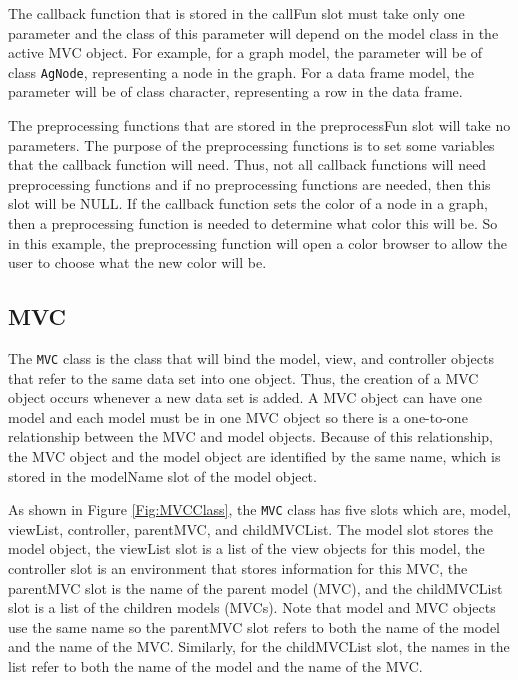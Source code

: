 \documentclass{article}[11pt]
\newcommand{\Robject}[1]{{\texttt{#1}}}
\begin{document}
The callback function that is stored in the callFun slot must take only one
parameter and the class of this parameter will depend on the model class in
the active MVC object.  For example, for a graph model, the
parameter will be of class \Robject{AgNode}, representing a node in the graph.
For a data frame model, the parameter will be of class character, representing
a row in the data frame.

The preprocessing functions that are stored in the preprocessFun slot will
take no parameters.  The purpose of the preprocessing functions is to set some
variables that the callback function will need.  Thus, not all callback
functions will need preprocessing functions and if no preprocessing functions
are needed, then this slot will be NULL.  If the callback function sets the
color of a node in a graph, then a preprocessing function is needed to
determine what color this will be.  So in this example, the preprocessing
function will open a color browser to allow the user to choose what the new
color will be.

\subsection{MVC}\label{Ssec:OneMVC}
 
The \Robject{MVC} class is the class that will bind the model, view, and
controller objects that refer to the same data set into one object.  Thus, the
creation of a MVC object occurs whenever a new data set is added.  A
MVC object can have one model and each model must be in one
MVC object so there is a one-to-one relationship between the
MVC and model objects.  Because of this relationship, the
MVC object and the model object are identified by the same name,
which is stored in the modelName slot of the model object. 

As shown in Figure \ref{Fig:MVCClass}, the \Robject{MVC} class has five slots
which are, model, viewList, controller, parentMVC, and childMVCList.  The
model slot stores the model object, the viewList slot is a list of the view
objects for this model, the controller slot is an environment that stores
information for this MVC, the parentMVC slot is the name of the parent model
(MVC), and the childMVCList slot is a list of the children models
(MVCs).  Note that model and MVC objects use the same name so the
parentMVC slot refers to both the name of the model and the name of the
MVC.  Similarly, for the childMVCList slot, the names in the list
refer to both the name of the model and the name of the MVC.
\end{document}
